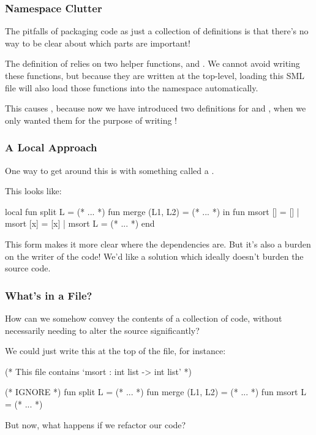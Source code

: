\documentclass[aspectratio=169]{beamer}
\begin{document}
\begin{frame}[fragile]
  \frametitle{Namespace Clutter}

  The pitfalls of packaging code as just a collection of definitions is
  that there's no way to be clear about which parts are important!

  \vspace{\fill}

  The definition of  relies on two helper functions, 
  and . We cannot avoid writing these functions, but because they
  are written at the top-level, loading this SML file will also load those
  functions into the namespace automatically.

  \vspace{\fill}
  
  This causes , because now we have introduced two
  definitions for  and , when we only wanted them
  for the purpose of writing ! 
\end{frame}

\begin{frame}[fragile]
  \frametitle{A Local Approach}

  One way to get around this is with something called a .

  \vspace{\fill}

  This looks like:

  \begin{codeblock}
    local
      fun split L = (* ... *)
      fun merge (L1, L2) = (* ... *)
    in
      fun msort [] = []
        | msort [x] = [x]
        | msort L = (* ... *) 
    end
  \end{codeblock}

  \vspace{\fill}

  This form makes it more clear where the dependencies are. But it's also a burden
  on the writer of the code! We'd like a solution which ideally doesn't burden
  the source code. 
\end{frame}

\begin{frame}[fragile]
  \frametitle{What's in a File?}

  How can we somehow convey the contents of a collection of code, without necessarily
  needing to alter the source significantly?

  \vspace{\fill}

  We could just write this at the top of the file, for instance:

  \begin{codeblock}
    (* This file contains `msort : int list -> int list' *)

    (* IGNORE *)
    fun split L = (* ... *)
    fun merge (L1, L2) = (* ... *)
    fun msort L = (* ... *)
  \end{codeblock}

  But now, what happens if we refactor our code?
\end{frame}
\end{document}

